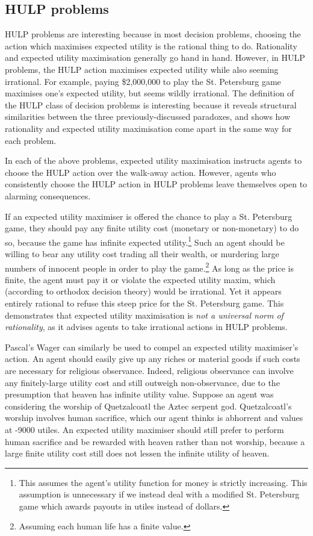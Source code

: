 \documentclass{article}
\begin{document}
\subsection{HULP problems}

HULP problems are interesting because in most decision problems, choosing the action which maximises expected utility is the rational thing to do. Rationality and expected utility maximisation generally go hand in hand. However, in HULP problems, the HULP action maximises expected utility while also seeming irrational. For example, paying \$2,000,000 to play the St. Petersburg game maximises one's expected utility, but seems wildly irrational. The definition of the HULP class of decision problems is interesting because it reveals structural similarities between the three previously-discussed paradoxes, and shows how rationality and expected utility maximisation come apart in the same way for each problem.

In each of the above problems, expected utility maximisation instructs agents to choose the HULP action over the walk-away action. However, agents who consistently choose the HULP action in HULP problems leave themselves open to alarming consequences.

If an expected utility maximiser is offered the chance to play a St. Petersburg game, they should pay any finite utility cost (monetary or non-monetary) to do so, because the game has infinite expected utility.\footnote{This assumes the agent's utility function for money is strictly increasing. This assumption is unnecessary if we instead deal with a modified St. Petersburg game which awards payouts in utiles instead of dollars.} Such an agent should be willing to bear any utility cost \textemdash{} trading all their wealth, or murdering large numbers of innocent people \textemdash{} in order to play the game.\footnote{Assuming each human life has a finite value.} As long as the price is finite, the agent must pay it or violate the expected utility maxim, which (according to orthodox decision theory) would be irrational. Yet it appears entirely rational to refuse this steep price for the St. Petersburg game. This demonstrates that expected utility maximisation is \textit{not a universal norm of rationality}, as it advises agents to take irrational actions in HULP problems.

Pascal's Wager can similarly be used to compel an expected utility maximiser's action. An agent should easily give up any riches or material goods if such costs are necessary for religious observance. Indeed, religious observance can involve any finitely-large utility cost and still outweigh non-observance, due to the presumption that heaven has infinite utility value. Suppose an agent was considering the worship of Quetzalcoatl the Aztec serpent god. Quetzalcoatl's worship involves human sacrifice, which our agent thinks is abhorrent and values at -9000 utiles. An expected utility maximiser should still prefer to perform human sacrifice and be rewarded with heaven rather than not worship, because a large finite utility cost still does not lessen the infinite utility of heaven. 
\end{document}
